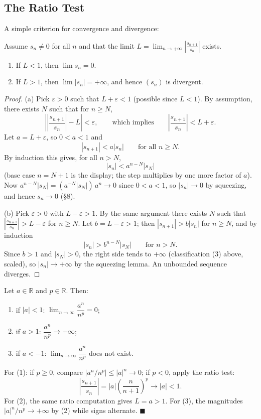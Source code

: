 \documentclass[11pt]{report}
\begin{document}
\subsection{The Ratio Test}

A simple criterion for convergence and divergence:

\begin{thmbox}
Assume $s_n \neq 0$ for all $n$ and that the limit $L = \displaystyle\lim_{n\to+\infty} \left| \frac{s_{n+1}}{s_n} \right|$ exists.
\begin{enumerate}[label=(\alph*)]
    \item If $L < 1$, then $\lim s_n = 0$.
    \item If $L > 1$, then $\lim |s_n| = +\infty$, and hence $(s_n)$ is divergent.
\end{enumerate}
\end{thmbox}

\begin{proof}
(a) Pick $\varepsilon > 0$ such that $L + \varepsilon < 1$ (possible since $L < 1$). By assumption, there exists $N$ such that for $n \geq N$,
\[
\left| \left| \frac{s_{n+1}}{s_n} \right| - L \right| < \varepsilon, \qquad \text{which implies} \qquad \left| \frac{s_{n+1}}{s_n} \right| < L + \varepsilon.
\]
Let $a = L + \varepsilon$, so $0 < a < 1$ and
\[
|s_{n+1}| < a |s_n| \qquad \text{for all } n \geq N.
\]
By induction this gives, for all $n > N$,
\[
|s_n| < a^{n - N} |s_N|
\]
(base case $n = N+1$ is the display; the step multiplies by one more factor of $a$). Now $a^{n-N} |s_N| = (a^{-N} |s_N|) \, a^n \to 0$ since $0 < a < 1$, so $|s_n| \to 0$ by squeezing, and hence $s_n \to 0$ (\S 8).

(b) Pick $\varepsilon > 0$ with $L - \varepsilon > 1$. By the same argument there exists $N$ such that $\left| \tfrac{s_{n+1}}{s_n} \right| > L - \varepsilon$ for $n \geq N$. Let $b = L - \varepsilon > 1$; then $|s_{n+1}| > b |s_n|$ for $n \geq N$, and by induction
\[
|s_n| > b^{n-N} |s_N| \qquad \text{for } n > N.
\]
Since $b > 1$ and $|s_N| > 0$, the right side tends to $+\infty$ (classification (3) above, scaled), so $|s_n| \to +\infty$ by the squeezing lemma. An unbounded sequence diverges.
\end{proof}

\begin{exbox}
Let $a \in \mathbb{R}$ and $p \in \mathbb{R}$. Then:
\begin{enumerate}[label=(\arabic*)]
    \item if $|a| < 1$: $\lim_{n\to\infty} \dfrac{a^n}{n^p} = 0$;
    \item if $a > 1$: $\dfrac{a^n}{n^p} \to +\infty$;
    \item if $a < -1$: $\lim_{n\to\infty} \dfrac{a^n}{n^p}$ does not exist.
\end{enumerate}
For (1): if $p \geq 0$, compare $|a^n / n^p| \leq |a|^n \to 0$; if $p < 0$, apply the ratio test:
\[
\left| \frac{s_{n+1}}{s_n} \right| = |a| \left( \frac{n}{n+1} \right)^p \longrightarrow |a| < 1.
\]
For (2), the same ratio computation gives $L = a > 1$. For (3), the magnitudes $|a|^n / n^p \to +\infty$ by (2) while signs alternate. \hfill $\blacksquare$
\end{exbox}
\end{document}

